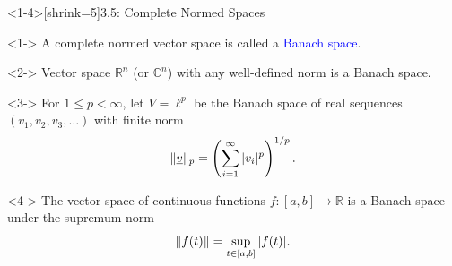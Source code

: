 \documentclass[10pt,english,aspectratio=169]{beamer}
\begin{document}
\begin{frame}<1-4>[shrink=5]{3.5: Complete Normed Spaces}


\begin{definition}<1->
A complete normed vector space is called a \textcolor{blue}{Banach space}.
\end{definition}

\begin{example}<2->
Vector space $\mathbb{R}^n$ (or $\mathbb{C}^n$) with any well-defined norm is a Banach space.
\end{example}

\begin{example}<3->
For $1 \leq p < \infty$, let $V = \ell^p$ be the Banach space of real sequences $(v_1,v_2,v_3,\ldots)$ with finite norm \vspace{-3mm}
\[ \|\underline{v} \|_p = \left(\sum_{i=1}^\infty |v_i |^p \right)^{1/p}. \]
\end{example}


\begin{example}<4->
The vector space of continuous functions $f \colon [a,b] \to \mathbb{R}$ is a Banach space under the supremum norm \vspace{-2.5mm}
\[ \left\| f(t) \right\| = \sup_{t\in [a,b]} |f(t)|. \vspace*{-0.5mm}\]
\end{example}


\end{frame}
\end{document}
